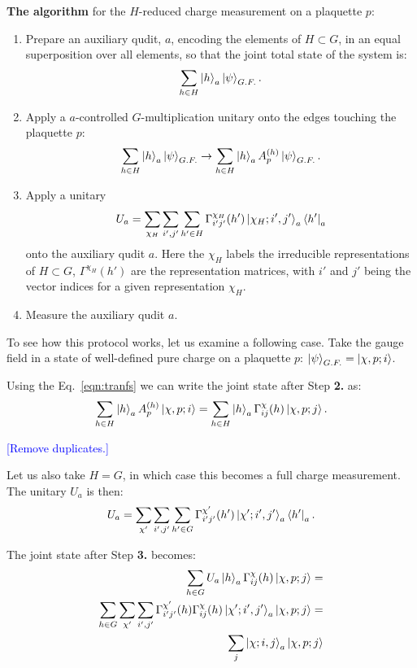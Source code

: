 \documentclass[two column]{article}
\newcommand{\jovan}[1]{\textcolor{blue}{[#1]}}
\begin{document}
\textbf{The algorithm} for the $H$-reduced charge measurement on a plaquette $p$:\begin{enumerate}
    \item Prepare an auxiliary qudit, $a$, encoding the elements of $H\subset G$, in an equal superposition over all elements, so that the joint total state of the system is: $$ \sum_{h \in H} \ket{h}_a\ket{\psi}_{G.F.}. $$
    \item Apply a $a$-controlled $G$-multiplication unitary onto the edges touching the plaquette $p$:$$ \sum_{h \in H} \ket{h}_a\ket{\psi}_{G.F.} \rightarrow \sum_{h \in H} \ket{h}_a A^{(h)}_p \ket{\psi}_{G.F.}. $$
    \item Apply a unitary $$ U_a = \sum_{\chi_H}\sum_{i', j'}\sum_{h'\in H}  \Gamma^{\chi_H}_{i'j'}(h')  \ket{\chi_H; i', j'}_a\bra{h'}_a $$ onto the auxiliary qudit $a$. Here the $\chi_H$ labels the irreducible representations of $H \subset G$, $\Gamma^{\chi_H}(h')$ are the representation matrices, with $i'$ and $j'$ being the vector indices for a given representation $\chi_H$.
    \item Measure the auxiliary qudit $a$.
\end{enumerate}

To see how this protocol works, let us examine a following case.
Take the gauge field in a state of well-defined pure charge on a plaquette $p$: $\ket{\psi}_{G.F.} = \ket{\chi, p; i}$.

Using the Eq.~\eqref{eqn:tranfs} we can write the joint state after Step \textbf{2.} as:
\begin{equation}
    \sum_{h \in H} \ket{h}_a A^{(h)}_p \ket{\chi, p; i} = \sum_{h \in H} \ket{h}_a \Gamma^{\chi}_{ij}(h) \ket{\chi, p; j}.
\end{equation}


\jovan{Remove duplicates.}

Let us also take $H = G$, in which case this becomes a full charge measurement. The unitary $U_a$ is then: \begin{equation}
    U_a = \sum_{\chi'}\sum_{i', j'}\sum_{h'\in G}  \Gamma^{\chi'}_{i'j'}(h') \ket{\chi'; i', j'}_a\bra{h'}_a.
\end{equation}

The joint state after Step \textbf{3.} becomes:\begin{equation}
    \begin{split}
        \sum_{h \in G} U_a\ket{h}_a \Gamma^{\chi}_{ij}(h) \ket{\chi, p; j} = \\
        \sum_{h \in G} \sum_{\chi'}\sum_{i', j'}  \Gamma^{\chi'}_{i'j'}(h)\Gamma^{\chi}_{ij}(h) \ket{\chi'; i', j'}_a \ket{\chi, p; j} =\\
        \sum_j\ket{\chi; i, j}_a \ket{\chi, p; j}
    \end{split}
\end{equation}
\end{document}
